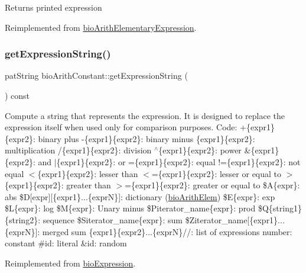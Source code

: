 \begin{DoxyReturn}{Returns}
printed expression 
\end{DoxyReturn}


Reimplemented from \hyperlink{classbio_arith_elementary_expression_a9293635c83789f547b5642855f8c8f16}{bio\+Arith\+Elementary\+Expression}.

\mbox{\label{classbio_arith_constant_ae815cae63ba8b2807c653fc1ca343672}} 
\subsubsection{\texorpdfstring{get\+Expression\+String()}{getExpressionString()}}
{\footnotesize\ttfamily pat\+String bio\+Arith\+Constant\+::get\+Expression\+String (\begin{DoxyParamCaption}{ }\end{DoxyParamCaption}) const\hspace{0.3cm}{\ttfamily [virtual]}}

Compute a string that represents the expression. It is designed to replace the expression itself when used only for comparison purposes. Code\+: +\{expr1\}\{expr2\}\+: binary plus -\/\{expr1\}\{expr2\}\+: binary minus \{expr1\}\{expr2\}\+: multiplication /\{expr1\}\{expr2\}\+: division $^\wedge$\{expr1\}\{expr2\}\+: power \&\{expr1\}\{expr2\}\+: and $\vert$\{expr1\}\{expr2\}\+: or =\{expr1\}\{expr2\}\+: equal !=\{expr1\}\{expr2\}\+: not equal $<$\{expr1\}\{expr2\}\+: lesser than $<$=\{expr1\}\{expr2\}\+: lesser or equal to $>$\{expr1\}\{expr2\}\+: greater than $>$=\{expr1\}\{expr2\}\+: greater or equal to \$A\{expr\}\+: abs \$D\mbox{[}expr\mbox{]}\mbox{[}\{expr1\}...\{exprN\}\mbox{]}\+: dictionary (\hyperlink{classbio_arith_elem}{bio\+Arith\+Elem}) \$E\{expr\}\+: exp \$L\{expr\}\+: log \$M\{expr\}\+: Unary minus \$\+Piterator\+\_\+name\{expr\}\+: prod \$Q\{string1\}\{string2\}\+: sequence \$\+Siterator\+\_\+name\{expr\}\+: sum \$\+Ziterator\+\_\+name\mbox{[}\{expr1\}...\{exprN\}\mbox{]}\+: merged sum \{expr1\}\{expr2\}...\{exprN\}//\+: list of expressions number\+: constant \#id\+: literal \&id\+: random 

Reimplemented from \hyperlink{classbio_expression_a3e4b4dca58dbbc6f0e411b30eb3f60b4}{bio\+Expression}.

